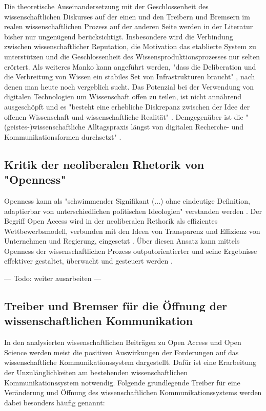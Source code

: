 Die theoretische Auseinandersetzung mit der Geschlossenheit des wissenschaftlichen Diskurses auf der einen und den Treibern und Bremsern im realen wissenschaftlichen Prozess auf der anderen Seite werden in der Literatur bisher nur ungenügend berücksichtigt. Insbesondere wird die Verbindung zwischen wissenschaftlicher Reputation, die Motivation das etablierte System zu unterstützen und die Geschlossenheit des Wissensproduktionsprozesses nur selten erörtert. Als weiteres Manko kann angeführt werden, "dass die Deliberation und die Verbreitung von Wissen ein stabiles Set von Infrastrukturen braucht" \cite{kelty_2004}, nach denen man heute noch vergeblich sucht. Das Potenzial bei der Verwendung von digitalen Technologien um Wissenschaft offen zu teilen, ist nicht annährend ausgeschöpft und es "besteht eine erhebliche Diskrepanz zwischen der Idee der offenen Wissenschaft und wissenschaftliche Realität" \cite{Scheliga_2014}. Demgegenüber ist die "(geistes-)wissenschaftliche Alltagspraxis längst von digitalen Recherche- und Kommunikationsformen durchsetzt" \cite{hagner_2015_sache_buches}.

\subsection{Kritik der neoliberalen Rhetorik von "Openness"}

Openness kann als "schwimmender Signifikant (...) ohne eindeutige Definition, adaptierbar von unterschiedlichen politischen Ideologien" verstanden werden \cite{Adema_2014_open_access}. Der Begriff Open Access wird in der neoliberalen Rethorik als effizientes Wettbewerbsmodell, verbunden mit den Ideen von Transparenz und Effizienz von Unternehmen und Regierung, eingesetzt \cite{tkacz_2012_open}. Über diesen Ansatz kann mittels Openness der wissenschaftlichen Prozess outputorientierter und seine Ergebnisse effektiver gestaltet, überwacht und gesteuert werden \cite{adema_2010_oaoverview} .

--- Todo: weiter ausarbeiten ---

\subsection{Treiber und Bremser für die Öffnung der wissenschaftlichen Kommunikation}

In den analysierten wissenschaftlichen Beiträgen zu Open Access und Open Science werden meist die positiven Auswirkungen der Forderungen auf das wissenschaftliche Kommunikationssystem dargestellt. Dafür ist eine Erarbeitung der Unzulänglichkeiten am bestehenden wissenschaftlichen Kommunikationssystem notwendig\cite{cite:17}. Folgende grundlegende Treiber für eine Veränderung und Öffnung des wissenschaftlichen Kommunikationssystems werden dabei besonders häufig genannt:

